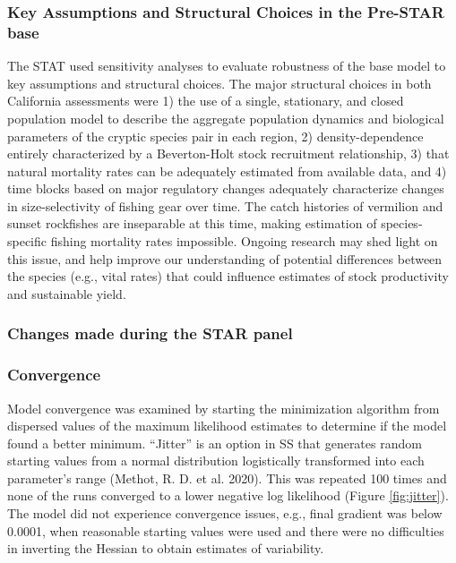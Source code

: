 \documentclass[
  english,
  a4paper,
]{article}
\begin{document}
\hypertarget{key-assumptions-and-structural-choices-in-the-pre-star-base}{%
\subsubsection{Key Assumptions and Structural Choices in the Pre-STAR base}\label{key-assumptions-and-structural-choices-in-the-pre-star-base}}

The STAT used sensitivity analyses to evaluate robustness of the base model to key assumptions and structural choices. The major structural choices in both California assessments were 1) the use of a single, stationary, and closed population model to describe the aggregate population dynamics and biological parameters of the cryptic species pair in each region, 2) density-dependence entirely characterized by a Beverton-Holt stock recruitment relationship, 3) that natural mortality rates can be adequately estimated from available data, and 4) time blocks based on major regulatory changes adequately characterize changes in size-selectivity of fishing gear over time. The catch histories of vermilion and sunset rockfishes are inseparable at this time, making estimation of species-specific fishing mortality rates impossible. Ongoing research may shed light on this issue, and help improve our understanding of potential differences between the species (e.g., vital rates) that could influence estimates of stock productivity and sustainable yield.

\hypertarget{changes-made-during-the-star-panel}{%
\subsubsection{Changes made during the STAR panel}\label{changes-made-during-the-star-panel}}

\hypertarget{convergence}{%
\subsubsection{Convergence}\label{convergence}}

Model convergence was examined by starting the minimization algorithm from dispersed
values of the maximum likelihood estimates to determine if the model found a better
minimum. ``Jitter'' is an option in SS that generates random starting values from a normal
distribution logistically transformed into each parameter's range (Methot, R. D. et al. 2020). This
was repeated 100 times and none of the runs converged to a lower negative log likelihood (Figure \ref{fig:jitter}).
The model did not experience convergence issues, e.g., final gradient was below 0.0001,
when reasonable starting values were used and there were no difficulties in inverting
the Hessian to obtain estimates of variability.
\end{document}
